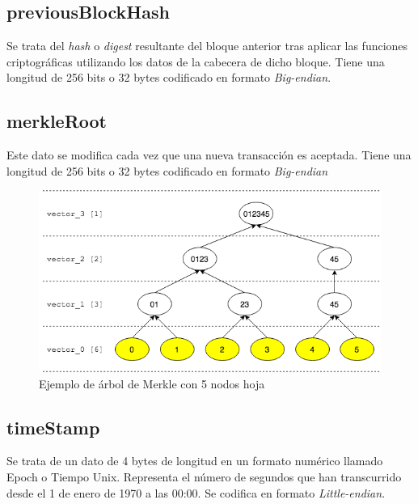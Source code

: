 \documentclass{article}
\begin{document}
    \subsection{previousBlockHash}
    Se trata del \textit{hash} o \textit{digest} resultante del bloque anterior tras aplicar las funciones criptográficas utilizando los datos de la cabecera de dicho bloque. Tiene una longitud de 256 bits o 32 bytes codificado en formato \textit{Big-endian}.
    
    \subsection{merkleRoot}
    Este dato se modifica cada vez que una nueva transacción es aceptada. Tiene una longitud de 256 bits o 32 bytes codificado en formato \textit{Big-endian}
    
    \begin{figure}[H]
    \centering
        \includegraphics[scale=0.55]{img/Merkle_tree_05_leaves_nodes}
        \caption{Ejemplo de árbol de Merkle con 5 nodos hoja}
    \end{figure}
    
    \subsection{timeStamp}
    Se trata de un dato de 4 bytes de longitud en un formato numérico llamado Epoch o Tiempo Unix. Representa el número de segundos que han transcurrido desde el 1 de enero de 1970 a las 00:00. Se codifica en formato \textit{Little-endian}. 
    
\end{document}
